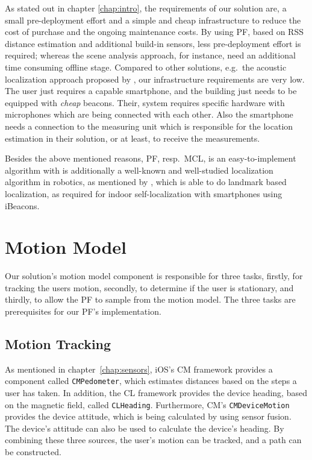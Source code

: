 As stated out in chapter \ref{chap:intro}, the requirements of our solution are, a small pre-deployment effort and a simple and cheap infrastructure to reduce the cost of purchase and the ongoing maintenance costs. By using \acs{PF}, based on \acs{RSS} distance estimation and additional build-in sensors, less pre-deployment effort is required; whereas the scene analysis approach, for instance, need an additional time consuming offline stage. Compared to other solutions, e.g.\ the acoustic localization approach proposed by \citet{hoflinger:acoustic}, our infrastructure requirements are very low. The user just requires a capable smartphone, and the building just needs to be equipped with \emph{cheap} beacons. Their, system requires specific hardware with microphones which are being connected with each other. Also the smartphone needs a connection to the measuring unit which is responsible for the location estimation in their solution, or at least, to receive the measurements.

Besides the above mentioned reasons, \acl{PF}, resp.\ \acs{MCL}, is an easy-to-implement algorithm with is additionally a well-known and well-studied localization algorithm in robotics, as mentioned by \citet{thrun:prob_robo}, which is able to do landmark based localization, as required for indoor self-localization with smartphones using iBeacons.

\section{Motion Model}\label{sec:algo_motion_model}
Our solution's motion model component is responsible for three tasks, firstly, for tracking the users motion, secondly, to determine if the user is stationary, and thirdly, to allow the \acs{PF} to sample from the motion model. The three tasks are prerequisites for our \acs{PF}'s implementation.

\subsection{Motion Tracking}
As mentioned in chapter~\ref{chap:sensors}, iOS's \ac{CM} framework provides a component called \texttt{CMPedometer}, which estimates distances based on the steps a user has taken. In addition, the \ac{CL} framework provides the device heading, based on the magnetic field, called \texttt{CLHeading}. Furthermore, \ac{CM}'s \texttt{CMDeviceMotion} provides the device attitude, which is being calculated by using sensor fusion. The device's attitude can also be used to calculate the device's heading. By combining these three sources, the user's motion can be tracked, and a path can be constructed.

